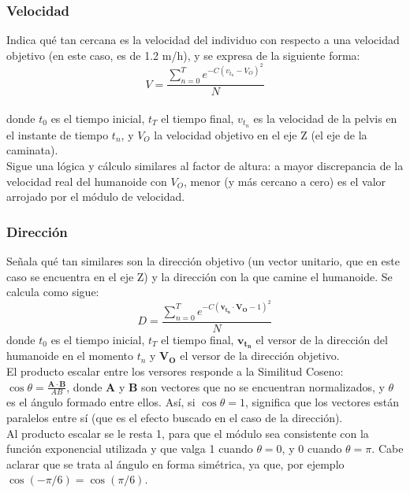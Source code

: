\documentclass{article}
\begin{document}

\subsubsection{Velocidad}
\label{velocidad}
Indica qu\'e tan cercana es la velocidad del individuo con respecto a una velocidad objetivo (en este caso, es de 1.2 m/h), y se expresa de la siguiente forma:\\
\begin{equation}
  V = \frac{\sum_{n=0}^{T} {e^{-C( v_{t_{n}} - V_{O} )^2  }}}{N}
\end{equation}
\\ donde $t_{0}$ es el tiempo inicial, $t_{T}$ el tiempo final, $v_{t_{n}}$ es la velocidad de la pelvis en el instante de tiempo $t_{n}$, y $V_{O}$ la velocidad objetivo en el eje Z (el eje de la caminata).
\\
Sigue una l\'ogica y c\'alculo similares al factor de altura: a mayor discrepancia de la velocidad real del humanoide con $V_{O}$, menor (y m\'as cercano a cero) es el valor arrojado por el m\'odulo de velocidad. 


\subsubsection{Direcci\'on}
\label{direccion}
Se\~nala qu\'e tan similares son la direcci\'on objetivo (un vector unitario, que en este caso se encuentra en el eje Z) y la direcci\'on con la que camine el humanoide. Se calcula como sigue:
\begin{equation}
 D = \frac{\sum_{n=0}^{T} {e^{-C( \boldsymbol{v_{t_{n}}} \cdot \boldsymbol{V_{O} } -1)^2 } } }{N}
\end{equation}
donde $t_{0}$ es el tiempo inicial, $t_{T}$ el tiempo final, $\boldsymbol{v_{t_{n}}}$ el versor de la direcci\'on del humanoide en el momento $t_{n}$ y $\boldsymbol{V_{O}}$ el versor de la direcci\'on objetivo.
\\ El producto escalar entre los versores responde a la Similitud Coseno: $\cos \theta = \frac{\boldsymbol{A} \cdot \boldsymbol{B} } {A B } $, donde \textbf{A} y \textbf{B} son vectores que no se encuentran normalizados, y $\theta$ es el \'angulo formado entre ellos. As\'i,  si $\cos \theta=1$, significa que los vectores est\'an paralelos entre s\'i (que es el efecto buscado en el caso de la direcci\'on). 
\\ Al producto escalar se le resta 1, para que el m\'odulo sea consistente con la funci\'on exponencial utilizada y que valga 1 cuando $\theta = 0$, y  0 cuando $\theta = \pi$. Cabe aclarar que se trata al \'angulo en forma sim\'etrica, ya que, por ejemplo $\cos(-\pi/6) = \cos(\pi/6)$.
\end{document}
